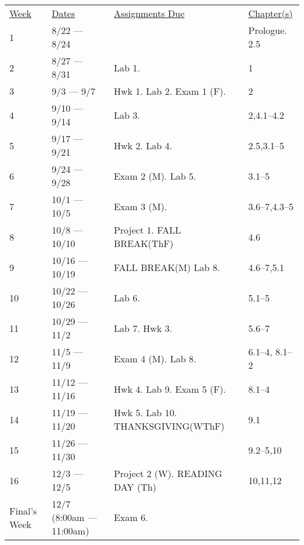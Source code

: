 \documentclass[10pt]{article}
\begin{document}
\begin{center}
\begin{tabular}{llll}
\underline{Week} & \underline{Dates} & \underline{Assignments Due} & \underline{Chapter(s)}\\
1 & 8/22 --- 8/24 &  &  Prologue. 2.5\\
2 & 8/27 --- 8/31 & Lab 1. &  1 \\
3 & 9/3 --- 9/7 & Hwk 1. Lab 2. Exam 1 (F).  &  2 \\
4 & 9/10 --- 9/14 & Lab 3. & 2,4.1--4.2 \\
5 & 9/17 --- 9/21 & Hwk 2. Lab 4. & 2.5,3.1--5\\
6 & 9/24 --- 9/28 & Exam 2 (M). Lab 5. & 3.1--5\\
7 & 10/1 --- 10/5 & Exam 3 (M). & 3.6--7,4.3--5  \\
8 & 10/8 --- 10/10 & Project 1. FALL BREAK(ThF) & 4.6 \\
9 & 10/16 --- 10/19 & FALL BREAK(M) Lab 8. & 4.6--7,5.1 \\
10 & 10/22 --- 10/26 & Lab 6. & 5.1--5 \\
11 & 10/29 --- 11/2 & Lab 7. Hwk 3. & 5.6--7 \\
12 & 11/5 --- 11/9 &  Exam 4 (M). Lab 8. & 6.1--4, 8.1--2 \\
13 & 11/12 --- 11/16 & Hwk 4. Lab 9. Exam 5 (F). & 8.1--4  \\
14 & 11/19 --- 11/20 & Hwk 5. Lab 10. THANKSGIVING(WThF) & 9.1 \\
15 & 11/26 --- 11/30 &   & 9.2--5,10 \\
16 & 12/3 --- 12/5 & Project 2 (W). READING DAY (Th) & 10,11,12 \\
Final's Week & 12/7 (8:00am --- 11:00am) & Exam 6.  &  \\
\end{tabular}
\end{center}
\end{document}

